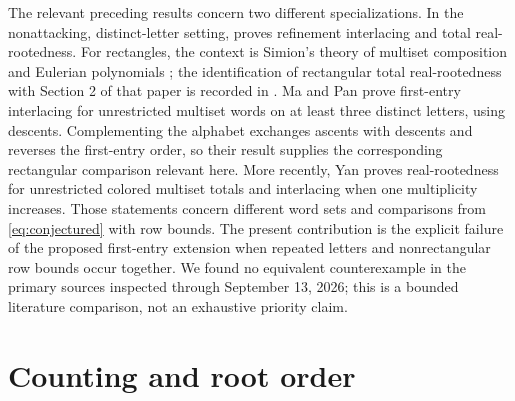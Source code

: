 \documentclass[11pt]{article}
\begin{document}
The relevant preceding results concern two different specializations.
In the nonattacking, distinct-letter setting,
\cite[Theorem 12]{AJQ2025} proves refinement interlacing and total
real-rootedness. For rectangles, the context is Simion's theory of
multiset composition and Eulerian polynomials \cite{Simion1984}; the
identification of rectangular total real-rootedness with Section 2 of that paper
is recorded in \cite[Section 3.3]{AJQ2025}.
Ma and Pan \cite[Theorem 1.11]{MaPan2023} prove first-entry interlacing
for unrestricted multiset words on at least three distinct letters, using
descents. Complementing the alphabet exchanges ascents with descents
and reverses the first-entry order, so their result supplies the
corresponding rectangular comparison relevant here. More recently,
Yan \cite[Theorems 1.4 and 1.5]{Yan2026} proves real-rootedness for
unrestricted colored multiset totals and interlacing when one multiplicity
increases. Those statements concern different word sets and comparisons
from \eqref{eq:conjectured} with row bounds.
The present contribution is the explicit failure of the proposed
first-entry extension when repeated letters and nonrectangular row bounds
occur together. We found no equivalent counterexample in the primary
sources inspected through September 13, 2026; this is a bounded literature
comparison, not an exhaustive priority claim.

\section{Counting and root order}
\end{document}
